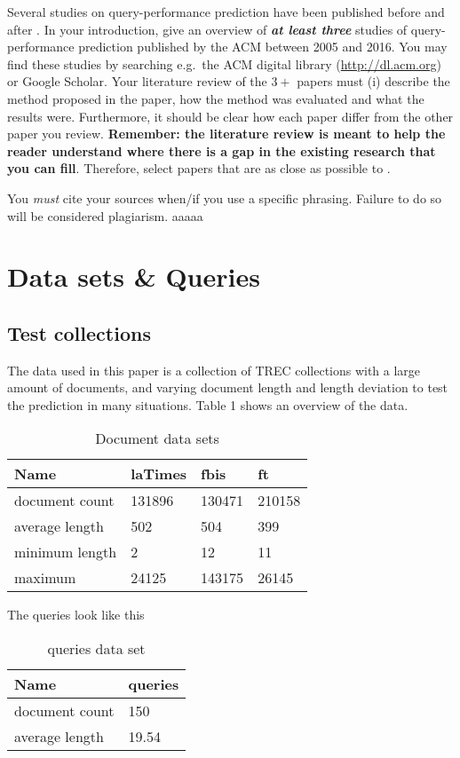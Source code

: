 \documentclass{sig-alternate}
\begin{document}
Several studies on query-performance prediction have been published before and after \cite{cummins2011improved}. In your introduction, give an overview of \textbf{\emph{at least three}} studies of query-performance prediction published by the ACM between 2005 and 2016. You may find these studies by searching e.g.\ the ACM digital library (\url{http://dl.acm.org}) or Google Scholar. Your literature review of the $3+$ papers must (i) describe the method proposed in the paper, how the method was evaluated and what the results were. Furthermore, it should be clear how each paper differ from the other paper you review. \textbf{Remember: the literature review is meant to help the reader understand where there is a gap in the existing research that you can fill}. Therefore, select papers that are as close as possible to \cite{cummins2011improved}. 

You \emph{must} cite your sources when/if you use a specific phrasing. Failure to do so will be considered plagiarism.
aaaaa
\section{Data sets \& Queries}
\subsection{Test collections}
The data used in this paper is a collection of TREC collections with a large amount of documents, and varying document length and length deviation to test the prediction in many situations. Table 1 shows an overview of the data.  
\begin{table}[h!]
\centering
\caption{Document data sets}
\label{my-label}
\begin{tabular}{|l|l|l|l|}
\hline
Name           & laTimes & fbis   & ft     \\ \hline
document count & 131896  & 130471 & 210158 \\ \hline
average length & 502     & 504    & 399    \\ \hline
minimum length & 2       & 12     & 11     \\ \hline
maximum        & 24125   & 143175 & 26145  \\ \hline
\end{tabular}
\end{table}

The queries look like this
\begin{table}[h!]
\centering
\caption{queries data set}
\label{my-label}
\begin{tabular}{|l|l|}
\hline
Name           & queries \\ \hline
document count & 150     \\ \hline
average length & 19.54   \\ \hline
\end{tabular}
\end{table}
\end{document}
